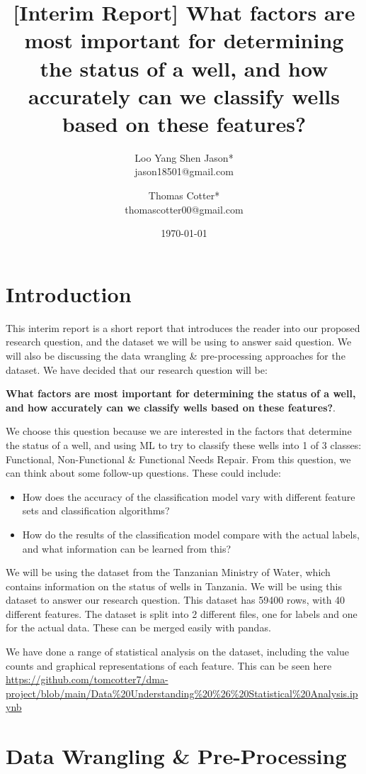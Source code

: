 \documentclass{article}
\title{[Interim Report] What factors are most important for determining the status of a well, and how accurately can we classify wells based on these features? }
\author{Loo Yang Shen Jason*\\
        jason18501@gmail.com \and Thomas Cotter*\\
        thomascotter00@gmail.com}
\date{\today}
\begin{document}
    
\maketitle

\section{Introduction}
\label{sec:intro}
This interim report is a short report that introduces the reader into our proposed research question, and the dataset we will be using to answer said question. We will also be discussing the data wrangling \& pre-processing approaches for the dataset. We have decided that our research question will be: 

\textbf{What factors are most important for determining the status of a well, and how accurately can we classify wells based on these features?}. 

We choose this question because we are interested in the factors that determine the status of a well, and using ML to try to classify these wells into 1 of 3 classes: Functional, Non-Functional \& Functional Needs Repair. From this question, we can think about some follow-up questions. These could include:
    \begin{itemize}
        \item How does the accuracy of the classification model vary with different feature sets and classification algorithms?
        \item How do the results of the classification model compare with the actual labels, and what information can be learned from this?
    \end{itemize}
 

We will be using the dataset from the Tanzanian Ministry of Water, which contains information on the status of wells in Tanzania. We will be using this dataset to answer our research question. This dataset has 59400 rows, with 40 different features. The dataset is split into 2 different files, one for labels and one for the actual data. These can be merged easily with pandas. 

We have done a range of statistical analysis on the dataset, including the value counts and graphical representations of each feature. This can be seen here \url{https://github.com/tomcotter7/dma-project/blob/main/Data\%20Understanding\%20\%26\%20Statistical\%20Analysis.ipynb}

\section{Data Wrangling \& Pre-Processing}
\end{document}
